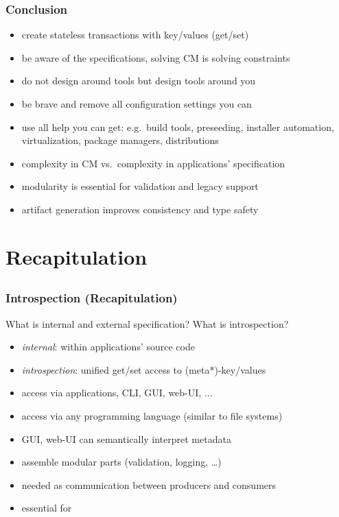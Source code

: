 \begin{frame}
	\frametitle{Conclusion}

	\begin{itemize}[<+-| alert@+>]
	\item create stateless transactions with key/values (get/set)
	\item be aware of the specifications, solving CM is solving constraints
	\item do not design around tools but design tools around you
	\item be brave and remove all configuration settings you can
	\item use all help you can get: e.g.\ build tools, preseeding, installer automation, virtualization, package managers, distributions
	\item complexity in CM vs.\ complexity in applications' specification
	\item modularity is essential for validation and legacy support
	\item artifact generation improves consistency and type safety
	\end{itemize}
\end{frame}






\section{Recapitulation}

\subsection{}

\begin{frame}
	\frametitle{Introspection (Recapitulation)}
	\begin{task}
	What is internal and external specification?
	What is introspection?
	\end{task}

	\pause
	\vspace{1em}

	\begin{itemize}
	\item \textit{internal}: within applications' source code
	\item \textit{introspection}: unified get/set access to (meta*)-key/values
	\item access via applications, CLI, GUI, web-UI, ...
	\item access via any programming language (similar to file systems)
	\item GUI, web-UI can semantically interpret metadata
	\item assemble modular parts (validation, logging, \dots)
	\item needed as communication between producers and consumers
	\item essential for ~\citet{holland2001nofutz}
	\end{itemize}
\end{frame}

